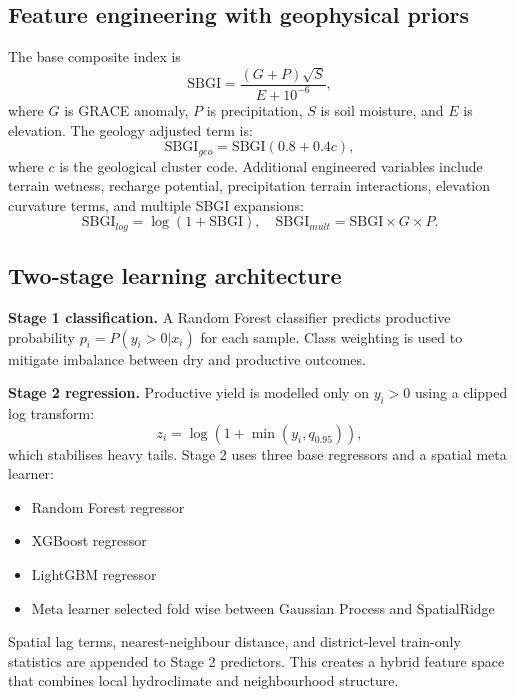 \documentclass[preprint,12pt]{elsarticle}
\begin{document}
\subsection{Feature engineering with geophysical priors}
The base composite index is
\begin{equation}
\mathrm{SBGI}=\frac{(G+P)\sqrt{S}}{E+10^{-6}},
\end{equation}
where $G$ is GRACE anomaly, $P$ is precipitation, $S$ is soil moisture, and $E$ is elevation. The geology adjusted term is:
\begin{equation}
\mathrm{SBGI}_{geo}=\mathrm{SBGI}(0.8+0.4c),
\end{equation}
where $c$ is the geological cluster code. Additional engineered variables include terrain wetness, recharge potential, precipitation terrain interactions, elevation curvature terms, and multiple SBGI expansions:
\begin{equation}
\mathrm{SBGI}_{log}=\log(1+\mathrm{SBGI}),\quad
\mathrm{SBGI}_{mult}=\mathrm{SBGI}\times G\times P.
\end{equation}

\subsection{Two-stage learning architecture}
\textbf{Stage 1 classification.} A Random Forest classifier predicts productive probability $p_i=P(y_i>0|x_i)$ for each sample. Class weighting is used to mitigate imbalance between dry and productive outcomes.

\textbf{Stage 2 regression.} Productive yield is modelled only on $y_i>0$ using a clipped log transform:
\begin{equation}
z_i=\log(1+\min(y_i, q_{0.95})),
\end{equation}
which stabilises heavy tails. Stage 2 uses three base regressors and a spatial meta learner:
\begin{itemize}
\item Random Forest regressor
\item XGBoost regressor
\item LightGBM regressor
\item Meta learner selected fold wise between Gaussian Process and SpatialRidge
\end{itemize}

Spatial lag terms, nearest-neighbour distance, and district-level train-only statistics are appended to Stage 2 predictors. This creates a hybrid feature space that combines local hydroclimate and neighbourhood structure.
\end{document}
